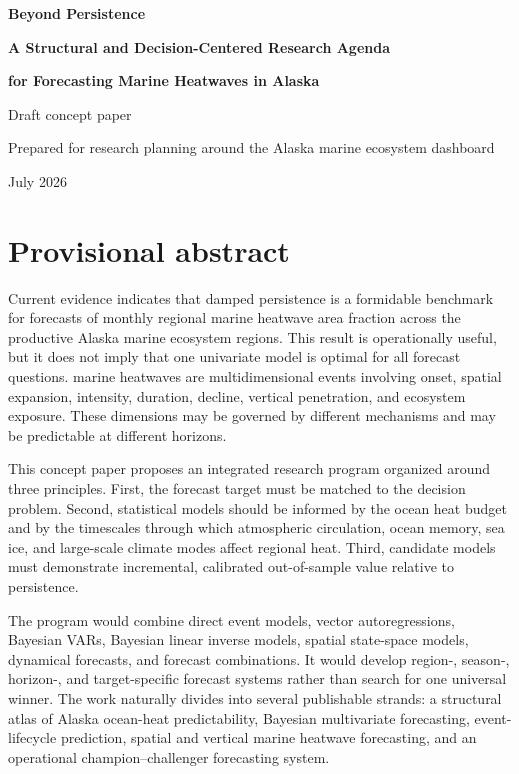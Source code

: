 \documentclass[11pt]{article}
\newcommand{\MHW}{marine heatwave}
\newcommand{\MHWs}{marine heatwaves}
\begin{document}
\begin{titlepage}
\centering
\vspace*{1.0in}
{\Huge\bfseries\sffamily Beyond Persistence\par}
\vspace{0.35in}
{\Large\bfseries A Structural and Decision-Centered Research Agenda\par}
\vspace{0.12in}
{\Large\bfseries for Forecasting Marine Heatwaves in Alaska\par}
\vspace{0.65in}
{\large Draft concept paper\par}
\vspace{0.2in}
{\large Prepared for research planning around the Alaska marine ecosystem dashboard\par}
\vfill
{\large July 2026\par}
\vspace*{0.5in}
\end{titlepage}

\tableofcontents
\newpage

\section*{Provisional abstract}

Current evidence indicates that damped persistence is a formidable benchmark for forecasts of monthly regional \MHW{} area fraction across the productive Alaska marine ecosystem regions. This result is operationally useful, but it does not imply that one univariate model is optimal for all forecast questions. \MHWs{} are multidimensional events involving onset, spatial expansion, intensity, duration, decline, vertical penetration, and ecosystem exposure. These dimensions may be governed by different mechanisms and may be predictable at different horizons.

This concept paper proposes an integrated research program organized around three principles. First, the forecast target must be matched to the decision problem. Second, statistical models should be informed by the ocean heat budget and by the timescales through which atmospheric circulation, ocean memory, sea ice, and large-scale climate modes affect regional heat. Third, candidate models must demonstrate incremental, calibrated out-of-sample value relative to persistence.

The program would combine direct event models, vector autoregressions, Bayesian VARs, Bayesian linear inverse models, spatial state-space models, dynamical forecasts, and forecast combinations. It would develop region-, season-, horizon-, and target-specific forecast systems rather than search for one universal winner. The work naturally divides into several publishable strands: a structural atlas of Alaska ocean-heat predictability, Bayesian multivariate forecasting, event-lifecycle prediction, spatial and vertical \MHW{} forecasting, and an operational champion--challenger forecasting system.
\end{document}
